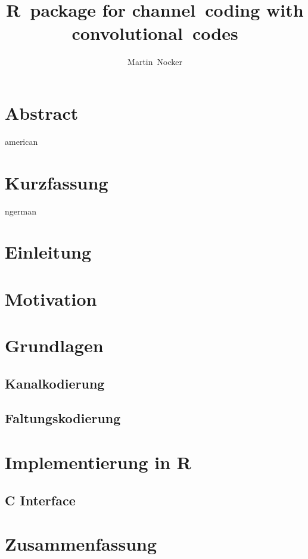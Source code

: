 \documentclass[germanthesis]{thesis-style}
\author{Martin~Nocker}
\title{R~package for channel~coding with convolutional~codes}
\begin{document}
\maketitle
\tableofcontents
{}

\chapter*{Abstract}
\begin{otherlanguage*}{american}
\end{otherlanguage*}

\chapter*{Kurzfassung}
\begin{otherlanguage*}{ngerman}
\end{otherlanguage*}
\acresetall%

\chapter{Einleitung}
\chapter{Motivation}
\chapter{Grundlagen}
\section{Kanalkodierung}
\section{Faltungskodierung}
\chapter{Implementierung in R}
\section{C Interface}
\chapter{Zusammenfassung}

\cleardoublepage%

\listofabbreviations
\clearpage

\listoffigures
\clearpage

\listoftables
\clearpage



\end{document}
